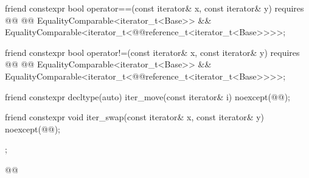 \begin{codeblock}
{{    friend constexpr bool operator==(const iterator& x, const iterator& y)
      requires @@
        @@ EqualityComparable<iterator_t<Base>> &&
        EqualityComparable<iterator_t<@@reference_t<iterator_t<Base>>>>;

    friend constexpr bool operator!=(const iterator& x, const iterator& y)
      requires @@
        @@ EqualityComparable<iterator_t<Base>> &&
        EqualityComparable<iterator_t<@@reference_t<iterator_t<Base>>>>;

    friend constexpr decltype(auto) iter_move(const iterator& i)
      noexcept(@\oldtxt{\seebelow}@);

    friend constexpr void iter_swap(const iterator& x, const iterator& y)
      noexcept(@\oldtxt{\seebelow}@);
  };
}@\oldtxt{\}}@
\end{codeblock}


